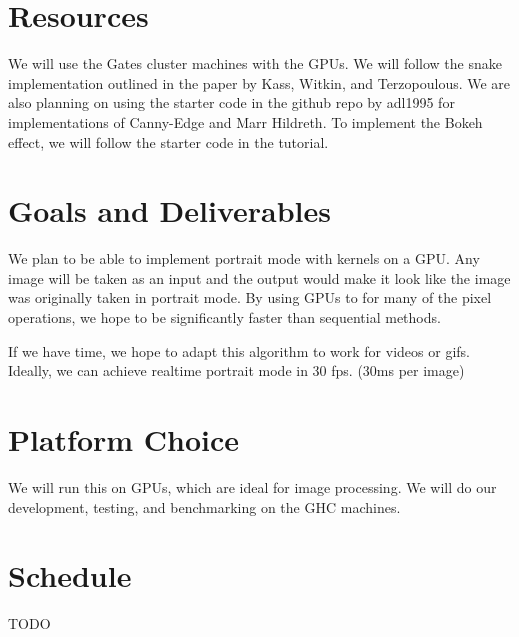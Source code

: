 \documentclass[12pt]{article}
\begin{document}
\section{Resources}

We will use the Gates cluster machines with the GPUs. We will follow the snake
implementation outlined in the paper by Kass, Witkin, and Terzopoulous.
\cite{paper} We are also planning on using the starter code in the github repo
by adl1995 for implementations of Canny-Edge and Marr Hildreth. \cite{edge} To
implement the Bokeh effect, we will follow the starter code in the tutorial.
\cite{bokeh}

\section{Goals and Deliverables}

We plan to be able to implement portrait mode with kernels on a GPU. Any image
will be taken as an input and the output would make it look like the image was
originally taken in portrait mode. By using GPUs to for many of the pixel
operations, we hope to be significantly faster than sequential methods.

If we have time, we hope to adapt this algorithm to work for videos or gifs.
Ideally, we can achieve realtime portrait mode in 30 fps. (30ms per image)

\section{Platform Choice}

We will run this on GPUs, which are ideal for image processing. We will do our
development, testing, and benchmarking on the GHC machines.

\section{Schedule}

TODO

\end{document}
